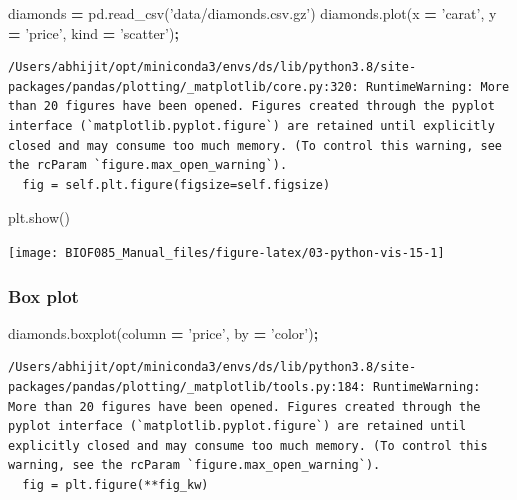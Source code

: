 \documentclass[
  letterpaper,
]{scrbook}
\newenvironment{Shaded}{\begin{snugshade}}{\end{snugshade}}
\newcommand{\NormalTok}[1]{#1}
\newcommand{\OperatorTok}[1]{\textcolor[rgb]{0.81,0.36,0.00}{\textbf{#1}}}
\newcommand{\StringTok}[1]{\textcolor[rgb]{0.31,0.60,0.02}{#1}}
\begin{document}
\begin{Shaded}
\begin{Highlighting}[]
\NormalTok{diamonds }\OperatorTok{=}\NormalTok{ pd.read_csv(}\StringTok{'data/diamonds.csv.gz'}\NormalTok{)}
\NormalTok{diamonds.plot(x }\OperatorTok{=} \StringTok{'carat'}\NormalTok{, y }\OperatorTok{=} \StringTok{'price'}\NormalTok{, kind }\OperatorTok{=} \StringTok{'scatter'}\NormalTok{)}\OperatorTok{;}
\end{Highlighting}
\end{Shaded}

\begin{verbatim}
/Users/abhijit/opt/miniconda3/envs/ds/lib/python3.8/site-packages/pandas/plotting/_matplotlib/core.py:320: RuntimeWarning: More than 20 figures have been opened. Figures created through the pyplot interface (`matplotlib.pyplot.figure`) are retained until explicitly closed and may consume too much memory. (To control this warning, see the rcParam `figure.max_open_warning`).
  fig = self.plt.figure(figsize=self.figsize)
\end{verbatim}

\begin{Shaded}
\begin{Highlighting}[]
\NormalTok{plt.show()}
\end{Highlighting}
\end{Shaded}

\begin{center}\texttt{[image: BIOF085\_Manual\_files/figure-latex/03-python-vis-15-1]} \end{center}

\hypertarget{box-plot}{%
\subsubsection{Box plot}\label{box-plot}}

\begin{Shaded}
\begin{Highlighting}[]
\NormalTok{diamonds.boxplot(column }\OperatorTok{=} \StringTok{'price'}\NormalTok{, by }\OperatorTok{=} \StringTok{'color'}\NormalTok{)}\OperatorTok{;}
\end{Highlighting}
\end{Shaded}

\begin{verbatim}
/Users/abhijit/opt/miniconda3/envs/ds/lib/python3.8/site-packages/pandas/plotting/_matplotlib/tools.py:184: RuntimeWarning: More than 20 figures have been opened. Figures created through the pyplot interface (`matplotlib.pyplot.figure`) are retained until explicitly closed and may consume too much memory. (To control this warning, see the rcParam `figure.max_open_warning`).
  fig = plt.figure(**fig_kw)
\end{verbatim}
\end{document}

